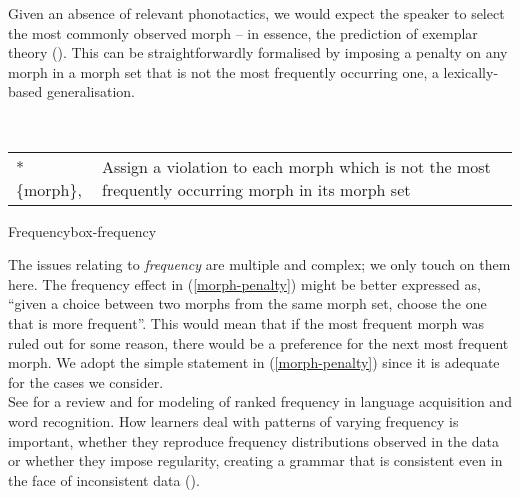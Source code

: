 Given an absence of relevant phonotactics, we would expect the speaker to select the most commonly observed morph -- in essence, the prediction of exemplar theory (\citealt{Bybee:2001, Pierrehumbert:2001ed, Pierrehumbert:2003PhoneticDiversity, Johnson:2007, Wedel:2007, vandeWeijer:2012}). This can be straightforwardly formalised by imposing a penalty on any morph in a morph set that is not the most frequently occurring one, a lexically-based generalisation.

\begin{example} \label{morph-penalty}\\
\begin{tabularx}{\linewidth}{@{}lQ@{}}
*\{morph\}, &Assign a violation to each  morph which is not the most frequently occurring morph in its morph set
\end{tabularx}
\end{example}

\begin{dadpbox}{Frequency}{box-frequency}

The issues relating to \textit{frequency} are multiple and complex; we only touch on them here. The frequency effect in (\ref{morph-penalty}) might be better expressed as, ``given a choice between two morphs from the same morph set, choose the one that is more frequent''. This would mean that if the most frequent morph was ruled out for some reason, there would be a preference for the next most frequent morph. We adopt the simple statement in (\ref{morph-penalty}) since it is adequate for the cases we consider. \\

See \citet{Yang:2016} for a review and for modeling of ranked frequency in language acquisition and word recognition. How learners deal with patterns of varying frequency is important, whether they reproduce frequency distributions observed in the data or whether they impose regularity, creating a grammar that is consistent even in the face of inconsistent data (\citealt{HudsonKam+:2005, HudsonKam+:2009}).
\end{dadpbox}

